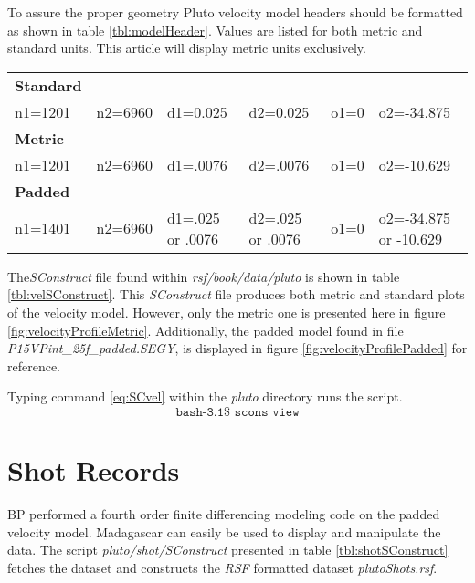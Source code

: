 To assure the proper geometry Pluto velocity model headers should be formatted as shown in table \ref{tbl:modelHeader}.  
Values are listed for both metric and standard units.  This article will display metric units exclusively.

{
\begin{tabular}[t]{|llllll|}
	\hline
	\textbf{Standard} &           &              &               &          &       \\
	n1=1201  &   n2=6960 & 	d1=0.025    &  	 d2=0.025   &	o1=0   & o2=-34.875     \\ 
	\textbf{Metric}   &           &              &               &          &       \\
	n1=1201  &   n2=6960 &   d1=.0076  &    d2=.0076  &     o1=0 & o2=-10.629  \\
	\textbf{Padded} & & & & & \\
	n1=1401 &    n2=6960 &	d1=.025 or .0076 & d2=.025 or .0076 & 	o1=0 & o2=-34.875 or -10.629   \\
	\hline
\end{tabular}
}


The\emph{SConstruct} file found within \emph{rsf/book/data/pluto} is shown in table \ref{tbl:velSConstruct}.  
This \emph{SConstruct} file produces both metric and standard plots of the velocity model.  However, only the metric one is 
presented here in figure \ref{fig:velocityProfileMetric}.  Additionally, the padded model found in file \emph{P15VPint\_25f\_padded.SEGY}, 
is displayed in figure \ref{fig:velocityProfilePadded} for reference.     

{
\tiny

\normalsize
}        

Typing command \ref{eq:SCvel} within the \emph{pluto} directory runs the script.
\begin{equation}\label{eq:SCvel} \texttt{bash-3.1\$\ scons\ view} \end{equation}


\section{Shot Records}
BP performed a fourth order finite differencing modeling code on the padded velocity model.  Madagascar can easily be used to 
display and manipulate the data.  The script \emph{pluto/shot/SConstruct} presented in table \ref{tbl:shotSConstruct} fetches 
the dataset and constructs the \emph{RSF} formatted dataset \emph{plutoShots.rsf}.  

